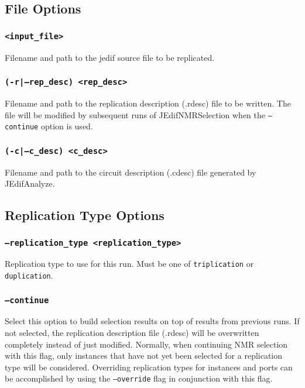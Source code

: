 \subsection{File Options}

\subsubsection{\texttt{<input\_file>}}
Filename and path to the jedif source file to be replicated.

\subsubsection{\texttt{(-r|--rep\_desc) <rep\_desc>}}
Filename and path to the replication description (.rdesc) file to be written.
The file will be modified by subsequent runs of JEdifNMRSelection when the
\texttt{--continue} option is used.

\subsubsection{\texttt{(-c|--c\_desc) <c\_desc>}}
Filename and path to the circuit description (.cdesc) file generated by
JEdifAnalyze.

\subsection{Replication Type Options}

\subsubsection{\texttt{--replication\_type <replication\_type>}}
Replication type to use for this run. Must be one of \texttt{triplication} or
\texttt{duplication}.

\subsubsection{\texttt{--continue}}
Select this option to build selection results on top of results from previous
runs. If not selected, the replication description file (.rdesc) will be
overwritten completely instead of just modified. Normally, when continuing NMR
selection with this flag, only instances that have not yet been selected for a
replication type will be considered. Overriding replication types for instances
and ports can be accomplished by using the \texttt{--override} flag in
conjunction with this flag.

